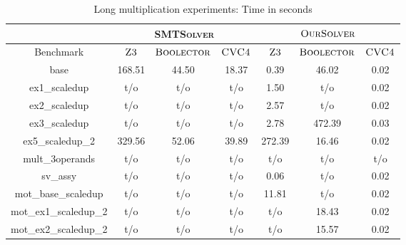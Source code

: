 \begin{table}[t]
\centering
\caption{Long multiplication experiments: Time in seconds}
\label{my-label}
\begin{tabular}{|c|c|c|c|c|c|c|}
\hline
                      & \multicolumn{3}{c|}{\textsc{SMTSolver}}       & \multicolumn{3}{c|}{$\textsc{OurSolver}$}       \\ \hline
Benchmark             & $\textsc{Z3}$ & $\textsc{Boolector}$ & $\textsc{CVC4}$ & $\textsc{Z3}$ & $\textsc{Boolector}$ & $\textsc{CVC4}$ \\ \hline
base                  & 168.51  & 44.50       & 18.37     & 0.39     & 46.02        & 0.02      \\ \hline
ex1\_scaledup         & t/o       & t/o          & t/o        & 1.50     & t/o          & 0.02      \\ \hline
ex2\_scaledup         & t/o       & t/o          & t/o        & 2.57     & t/o          & 0.02      \\ \hline
ex3\_scaledup         & t/o       & t/o          & t/o        & 2.78     & 472.39     & 0.03      \\ \hline
ex5\_scaledup\_2      & 329.56  & 52.06       & 39.89     & 272.39  & 16.46       & 0.02      \\ \hline
mult\_3operands       & t/o       & t/o          & t/o        & t/o       & t/o          & t/o        \\ \hline
sv\_assy              & t/o       & t/o          & t/o        & 0.06     & t/o          & 0.02      \\ \hline
mot\_base\_scaledup   & t/o       & t/o          & t/o        & 11.81    & t/o          & 0.02      \\ \hline
mot\_ex1\_scaledup\_2 & t/o       & t/o          & t/o        & t/o       & 18.43       & 0.02      \\ \hline
mot\_ex2\_scaledup\_2 & t/o       & t/o          & t/o        & t/o       & 15.57       & 0.02      \\ \hline
\end{tabular}
\end{table}


